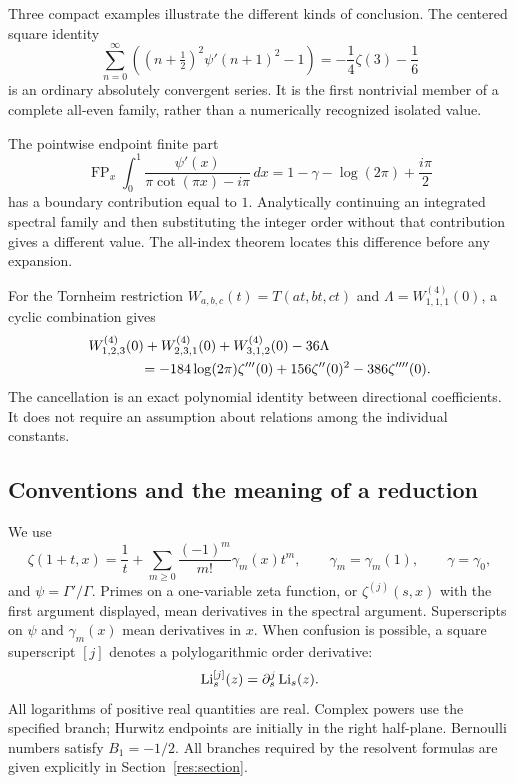Three compact examples illustrate the different kinds of conclusion.
The centered square identity
\begin{equation}\label{scope:sample-square}
 \sum_{n=0}^{\infty}
 \left((n+\tfrac12)^2\psi'(n+1)^2-1\right)
       =-\frac14\zeta(3)-\frac16
\end{equation}
is an ordinary absolutely convergent series. It is the first
nontrivial member of a complete all-even family, rather than a
numerically recognized isolated value.

The pointwise endpoint finite part
\begin{equation}\label{scope:sample-resolvent}
 \operatorname{FP}_x\int_0^1
 \frac{\psi'(x)}{\pi\cot(\pi x)-i\pi}\,dx
       =1-\gamma-\log(2\pi)+\frac{i\pi}{2}
\end{equation}
has a boundary contribution equal to $1$. Analytically continuing an
integrated spectral family and then substituting the integer order
without that contribution gives a different value. The all-index
theorem locates this difference before any expansion.

For the Tornheim restriction $W_{a,b,c}(t)=T(at,bt,ct)$ and
$\Lambda=W_{1,1,1}^{(4)}(0)$, a cyclic combination gives
\begin{align}\label{scope:sample-quartic}
 &W_{1,2,3}^{(4)}(0)+W_{2,3,1}^{(4)}(0)
       +W_{3,1,2}^{(4)}(0)-36\Lambda\notag\\
 &\hspace{13mm}=-184\log(2\pi)\zeta'''(0)
                +156\zeta''(0)^2-386\zeta''''(0).
\end{align}
The cancellation is an exact polynomial identity between directional
coefficients. It does not require an assumption about relations among
the individual constants.

\subsection{Conventions and the meaning of a reduction}

We use
\[
 \zeta(1+t,x)=\frac1t+
      \sum_{m\ge0}\frac{(-1)^m}{m!}\gamma_m(x)t^m,\qquad
 \gamma_m=\gamma_m(1),\qquad \gamma=\gamma_0,
\]
and $\psi=\Gamma'/\Gamma$. Primes on a one-variable zeta function, or
$\zeta^{(j)}(s,x)$ with the first argument displayed, mean derivatives
in the spectral argument. Superscripts on $\psi$ and $\gamma_m(x)$
mean derivatives in $x$. When confusion is possible, a square
superscript $[j]$ denotes a polylogarithmic order derivative:
\[
 \operatorname{Li}_s^{[j]}(z)=\partial_s^j\operatorname{Li}_s(z).
\]
All logarithms of positive real quantities are real. Complex powers
use the specified branch; Hurwitz endpoints are initially in the
right half-plane. Bernoulli numbers satisfy $B_1=-1/2$.
All branches required by the resolvent formulas are given explicitly
in Section~\ref{res:section}.


